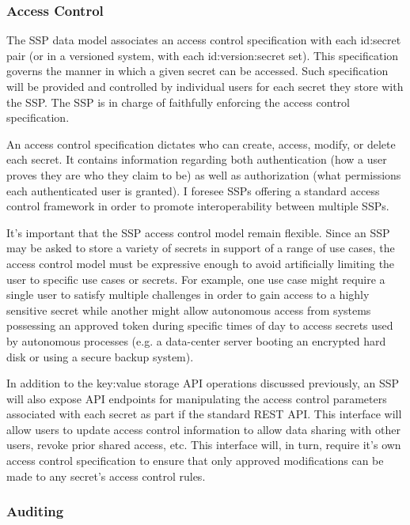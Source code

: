 \subsubsection{Access Control}

The SSP data model associates an access control specification with
each id:secret pair (or in a versioned system, with each
id:version:secret set). This specification governs the manner in which
a given secret can be accessed. Such specification will be provided
and controlled by individual users for each secret they store with the
SSP. The SSP is in charge of faithfully enforcing the access control
specification.

An access control specification dictates who can create, access,
modify, or delete each secret. It contains information regarding both
authentication (how a user proves they are who they claim to be) as
well as authorization (what permissions each authenticated user is
granted). I foresee SSPs offering a standard access control framework
in order to promote interoperability between multiple SSPs.

It's important that the SSP access control model remain
flexible. Since an SSP may be asked to store a variety of secrets in
support of a range of use cases, the access control model must be
expressive enough to avoid artificially limiting the user to specific
use cases or secrets. For example, one use case might require a single
user to satisfy multiple challenges in order to gain access to a
highly sensitive secret while another might allow autonomous access
from systems possessing an approved token during specific times of day
to access secrets used by autonomous processes (e.g. a data-center
server booting an encrypted hard disk or using a secure backup
system).

In addition to the key:value storage API operations discussed
previously, an SSP will also expose API endpoints for manipulating the
access control parameters associated with each secret as part if the
standard REST API. This interface will allow users to update access
control information to allow data sharing with other users, revoke
prior shared access, etc. This interface will, in turn, require it's
own access control specification to ensure that only approved
modifications can be made to any secret's access control rules.

\subsubsection{Auditing}

